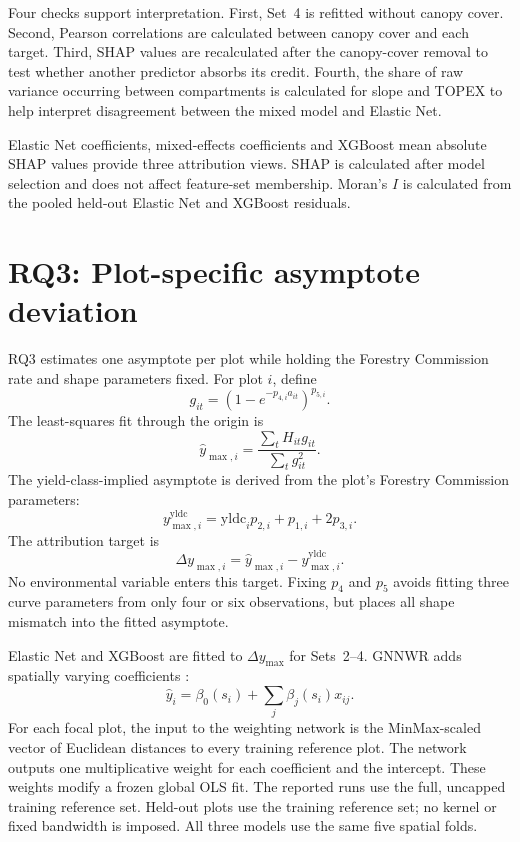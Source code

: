 Four checks support interpretation. First, Set~4 is refitted without canopy cover. Second, Pearson
correlations are calculated between canopy cover and each target. Third, SHAP values
are recalculated after the canopy-cover removal to test whether another predictor absorbs its
credit. Fourth, the share of raw variance occurring between compartments is calculated for slope
and TOPEX to help interpret disagreement between the mixed model and Elastic Net.

Elastic Net coefficients, mixed-effects coefficients and XGBoost mean absolute SHAP values provide
three attribution views. SHAP is calculated after model selection and does not affect feature-set
membership. Moran's $I$ is calculated from the pooled held-out Elastic Net and XGBoost residuals.

\section{RQ3: Plot-specific asymptote deviation}
\label{sec:rq3-method}

RQ3 estimates one asymptote per plot while holding the Forestry Commission rate and shape
parameters fixed. For plot $i$, define
\begin{equation}
g_{it}=\left(1-e^{-p_{4,i}a_{it}}\right)^{p_{5,i}}.
\end{equation}
The least-squares fit through the origin is
\begin{equation}
\hat y_{\max,i}=\frac{\sum_t H_{it}g_{it}}{\sum_t g_{it}^2}.
\label{eq:plot-ymax-fit}
\end{equation}
The yield-class-implied asymptote is derived from the plot's Forestry Commission parameters:
\begin{equation}
y_{\max,i}^{\mathrm{yldc}}=\mathrm{yldc}_i p_{2,i}+p_{1,i}+2p_{3,i}.
\end{equation}
The attribution target is
\begin{equation}
\Delta y_{\max,i}=\hat y_{\max,i}-y_{\max,i}^{\mathrm{yldc}}.
\label{eq:local-ymax-diff}
\end{equation}
No environmental variable enters this target. Fixing $p_4$ and $p_5$ avoids fitting three curve
parameters from only four or six observations, but places all shape mismatch into the fitted
asymptote.

Elastic Net and XGBoost are fitted to $\Delta y_{\max}$ for Sets~2--4. GNNWR adds spatially varying
coefficients \citep{du2020Geographically_C6_GWR}:
\begin{equation}
\hat y_i=\beta_0(s_i)+\sum_j\beta_j(s_i)x_{ij}.
\label{eq:gnnwr}
\end{equation}
For each focal plot, the input to the weighting network is the MinMax-scaled vector of Euclidean
distances to every training reference plot. The network outputs one multiplicative weight for
each coefficient and the intercept. These weights modify a frozen global OLS fit. The reported
runs use the full, uncapped training reference set. Held-out plots use the training reference set;
no kernel or fixed bandwidth is imposed. All three models use the same five spatial folds.

